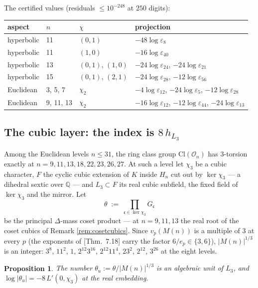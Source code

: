 \documentclass[11pt]{amsart}
\numberwithin{equation}{section}
\theoremstyle{plain}
\newtheorem{proposition}[theorem]{Proposition}
\theoremstyle{definition}
\theoremstyle{remark}
\newcommand{\Q}{\mathbb{Q}}
\newcommand{\Cl}{\mathrm{Cl}}
\newcommand{\idealc}{\mathfrak{c}}
\newcommand{\Oc}{\mathcal{O}}
\newcommand{\eps}{\varepsilon}
\newcommand{\PaperI}{\cite{SchmidtI}}
\begin{document}
The certified values (residuals $\le 10^{-248}$ at $250$ digits):
\begin{center}
\small
\begin{tabular}{@{}llll@{}}
\toprule
aspect & $n$ & $\chi$ & projection\\
\midrule
hyperbolic & 11 & $(0,1)$ & $-48\log\eps_8$\\
hyperbolic & 11 & $(1,0)$ & $-16\log\eps_{40}$\\
hyperbolic & 13 & $(0,1)$, $(1,0)$ & $-24\log\eps_{24}$, $-24\log\eps_{21}$\\
hyperbolic & 15 & $(0,1)$, $(2,1)$ & $-24\log\eps_{28}$, $-12\log\eps_{56}$\\
Euclidean & 3, 5, 7 & $\chi_2$ & $-4\log\eps_{12}$, $-24\log\eps_5$,
$-12\log\eps_{28}$\\
Euclidean & 9, 11, 13 & $\chi_2$ & $-16\log\eps_{12}$, $-12\log\eps_{44}$,
$-24\log\eps_{13}$\\
\bottomrule
\end{tabular}
\end{center}

\subsection{The cubic layer: the index is $8\,h_{L_3}$}
\label{subsec:cubic}

Among the Euclidean levels $n \le 31$, the ring class group $\Cl(\Oc_n)$
has $3$-torsion exactly at $n = 9, 11, 13, 18, 22, 23, 26, 27$.  At such a
level let $\chi_3$ be a cubic character, $F$ the cyclic cubic extension
of $K$ inside $H_n$ cut out by $\ker\chi_3$ --- a dihedral sextic over
$\Q$ --- and $L_3 \subset F$ its real cubic subfield, the fixed field of
$\ker\chi_3$ and the mirror.  Let
\[
  \theta \;:=\; \prod_{\idealc \in \ker\chi_3}G_\idealc
\]
be the principal $\Delta$-mass coset product --- at $n = 9, 11, 13$ the
real root of the coset cubics of Remark \ref{rem:cosetcubics}.  Since
$v_p(M(n))$ is a multiple of $3$ at every $p$ (the exponents of
\PaperI[Thm.~7.18] carry the factor $6/e_p \in \{3, 6\}$), $|M(n)|^{1/3}$
is an integer: $3^8$, $11^2$, $1$, $2^{12}3^{16}$, $2^{12}11^4$, $23^2$,
$2^{12}$, $3^{26}$ at the eight levels.

\begin{proposition}\label{prop:thetaunit}
The number $\theta_u := \theta/|M(n)|^{1/3}$ is an algebraic \emph{unit}
of $L_3$, and $\log|\theta_u| = -8\,L'(0,\chi_3)$ at the real embedding.
\end{proposition}
\end{document}
